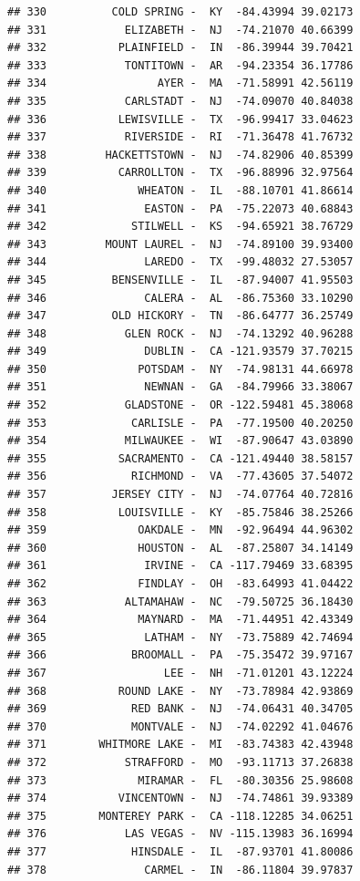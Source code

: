 \documentclass{article}\usepackage[]{graphicx}\usepackage[]{color}
\makeatletter
\newenvironment{kframe}{%
 \def\at@end@of@kframe{}%
 \ifinner\ifhmode%
  \def\at@end@of@kframe{\end{minipage}}%
  \begin{minipage}{\columnwidth}%
 \fi\fi%
 \def\FrameCommand##1{\hskip\@totalleftmargin \hskip-\fboxsep
 \colorbox{shadecolor}{##1}\hskip-\fboxsep
     \hskip-\linewidth \hskip-\@totalleftmargin \hskip\columnwidth}%
 \MakeFramed {\advance\hsize-\width
   \@totalleftmargin\z@ \linewidth\hsize
   \@setminipage}}%
 {\par\unskip\endMakeFramed%
 \at@end@of@kframe}
\newenvironment{knitrout}{}{} %
\makeatother
\begin{document}
\begin{knitrout}
\begin{kframe}
\begin{verbatim}
## 330          COLD SPRING -  KY  -84.43994 39.02173
## 331            ELIZABETH -  NJ  -74.21070 40.66399
## 332           PLAINFIELD -  IN  -86.39944 39.70421
## 333            TONTITOWN -  AR  -94.23354 36.17786
## 334                 AYER -  MA  -71.58991 42.56119
## 335            CARLSTADT -  NJ  -74.09070 40.84038
## 336           LEWISVILLE -  TX  -96.99417 33.04623
## 337            RIVERSIDE -  RI  -71.36478 41.76732
## 338         HACKETTSTOWN -  NJ  -74.82906 40.85399
## 339           CARROLLTON -  TX  -96.88996 32.97564
## 340              WHEATON -  IL  -88.10701 41.86614
## 341               EASTON -  PA  -75.22073 40.68843
## 342             STILWELL -  KS  -94.65921 38.76729
## 343         MOUNT LAUREL -  NJ  -74.89100 39.93400
## 344               LAREDO -  TX  -99.48032 27.53057
## 345          BENSENVILLE -  IL  -87.94007 41.95503
## 346               CALERA -  AL  -86.75360 33.10290
## 347          OLD HICKORY -  TN  -86.64777 36.25749
## 348            GLEN ROCK -  NJ  -74.13292 40.96288
## 349               DUBLIN -  CA -121.93579 37.70215
## 350              POTSDAM -  NY  -74.98131 44.66978
## 351               NEWNAN -  GA  -84.79966 33.38067
## 352            GLADSTONE -  OR -122.59481 45.38068
## 353             CARLISLE -  PA  -77.19500 40.20250
## 354            MILWAUKEE -  WI  -87.90647 43.03890
## 355           SACRAMENTO -  CA -121.49440 38.58157
## 356             RICHMOND -  VA  -77.43605 37.54072
## 357          JERSEY CITY -  NJ  -74.07764 40.72816
## 358           LOUISVILLE -  KY  -85.75846 38.25266
## 359              OAKDALE -  MN  -92.96494 44.96302
## 360              HOUSTON -  AL  -87.25807 34.14149
## 361               IRVINE -  CA -117.79469 33.68395
## 362              FINDLAY -  OH  -83.64993 41.04422
## 363            ALTAMAHAW -  NC  -79.50725 36.18430
## 364              MAYNARD -  MA  -71.44951 42.43349
## 365               LATHAM -  NY  -73.75889 42.74694
## 366             BROOMALL -  PA  -75.35472 39.97167
## 367                  LEE -  NH  -71.01201 43.12224
## 368           ROUND LAKE -  NY  -73.78984 42.93869
## 369             RED BANK -  NJ  -74.06431 40.34705
## 370             MONTVALE -  NJ  -74.02292 41.04676
## 371        WHITMORE LAKE -  MI  -83.74383 42.43948
## 372            STRAFFORD -  MO  -93.11713 37.26838
## 373              MIRAMAR -  FL  -80.30356 25.98608
## 374           VINCENTOWN -  NJ  -74.74861 39.93389
## 375        MONTEREY PARK -  CA -118.12285 34.06251
## 376            LAS VEGAS -  NV -115.13983 36.16994
## 377             HINSDALE -  IL  -87.93701 41.80086
## 378               CARMEL -  IN  -86.11804 39.97837

\end{verbatim}
\end{kframe}
\end{knitrout}
\end{document}
